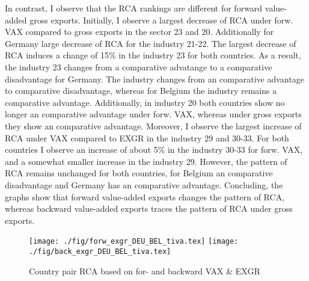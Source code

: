  \par
In contrast, I observe that the RCA rankings are different for forward value-added gross exports.
Initially, I observe a largest decrease of RCA under forw. VAX compared to gross exports in the sector 23 and 20.
Additionally for Germany large decrease of RCA for the industry 21-22.
The largest decrease of RCA induces a change of 15\%  in the industry 23 for both countries.
As a result, the industry 23 changes from a comparative advatange to a comparative disadvantage for Germany.
The industry changes from an comparative advantage to comparative disadvantage, whereas for Belgium the industry remains a comparative advantage.
Additionally, in industry 20 both countries show no longer an comparative advantage under forw. VAX, whereas under gross exports they show an comparative advantage.
Moreover, I observe the largest increase of RCA under VAX compared to EXGR in the industry 29 and 30-33.
For both countries I observe an increase of about 5\% in the industry 30-33 for forw. VAX, and a somewhat smaller increase in the industry 29.
However, the pattern of RCA remains unchanged for both countries, for Belgium an comparative disadvantage and Germany has an comparative advantage.
Concluding, the graphs show that forward value-added exports changes the pattern of RCA, whereas backward value-added exports traces the pattern of RCA under gross exports.
 \begin{figure}
\caption{Country pair RCA based on for- and backward  VAX \& EXGR }
\texttt{[image: ./fig/forw\_exgr\_DEU\_BEL\_tiva.tex]}
\texttt{[image: ./fig/back\_exgr\_DEU\_BEL\_tiva.tex]}
\end{figure}

\endinput
